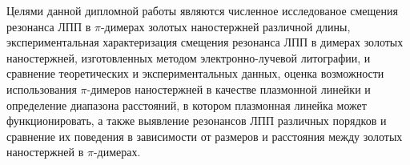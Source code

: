 Целями данной дипломной работы являются численное исследованое смещения резонанса ЛПП в $ \pi $-димерах золотых наностержней различной длины, экспериментальная характеризация смещения резонанса ЛПП в димерах золотых наностержней, изготовленных методом электронно-лучевой литографии, и сравнение теоретических и экспериментальных данных, оценка возможности использования $ \pi $-димеров наностержней в качестве плазмонной линейки и определение диапазона расстояний, в котором плазмонная линейка может функционировать, а также выявление резонансов ЛПП различных порядков и сравнение их поведения в зависимости от размеров и расстояния между золотых наностержней в $ \pi $-димерах.